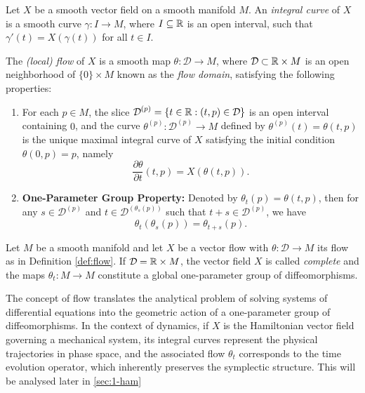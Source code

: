 \begin{definition}\label{def:flow}
	Let $X$ be a smooth vector field on a smooth manifold $M$. An \textit{integral curve} of $X$ is a smooth curve $\gamma: I \to M$, where $I \subseteq \mathbb{R}$ is an open interval, such that $\gamma'(t) = X(\gamma(t))$ for all $t \in I$.
	
	\noindent The \textit{(local) flow} of $X$ is a smooth map $\theta: \mathcal{D} \to M$, where $\mathcal{D} \subset \R \times M$ is an open neighborhood of $\{0\} \times M$ known as the \textit{flow domain}, satisfying the following properties:
	\begin{enumerate}
		\item For each $p \in M$, the slice $\mathcal{D}^{(p)} = \{t \in \R : (t, p) \in \mathcal{D}\}$ is an open interval containing $0$, and the curve $\theta^{(p)}: \mathcal{D}^{(p)} \to M$ defined by $\theta^{(p)}(t) = \theta(t, p)$ is the unique maximal integral curve of $X$ satisfying the initial condition $\theta(0, p) = p$, namely
		\[
		\frac{\partial \theta}{\partial t}(t, p) = X(\theta(t, p)).
		\]
		\item \textbf{One-Parameter Group Property:} Denoted by $\theta_t(p) = \theta(t, p)$, then for any $s \in \mathcal{D}^{(p)}$ and $t \in \mathcal{D}^{(\theta_s(p))}$ such that $t+s \in \mathcal{D}^{(p)}$, we have
		\[
		\theta_t(\theta_s(p)) = \theta_{t+s}(p).
		\]
	\end{enumerate}
\end{definition}

\begin{proposition}
	Let $M$ be a smooth manifold and let $X$ be a vector flow with $\theta: \mathcal{D} \to M$ its flow as in Definition \ref{def:flow}. If $\mathcal{D} = \R \times M$, the vector field $X$ is called \textit{complete} and the maps $\theta_t: M \to M$ constitute a global one-parameter group of diffeomorphisms.
\end{proposition}

The concept of flow translates the analytical problem of solving systems of differential equations into the geometric action of a one-parameter group of diffeomorphisms. In the context of dynamics, if $X$ is the Hamiltonian vector field governing a mechanical system, its integral curves represent the physical trajectories in phase space, and the associated flow $\theta_t$ corresponds to the time evolution operator, which inherently preserves the symplectic structure. This will be analysed later in \ref{sec:1-ham}

